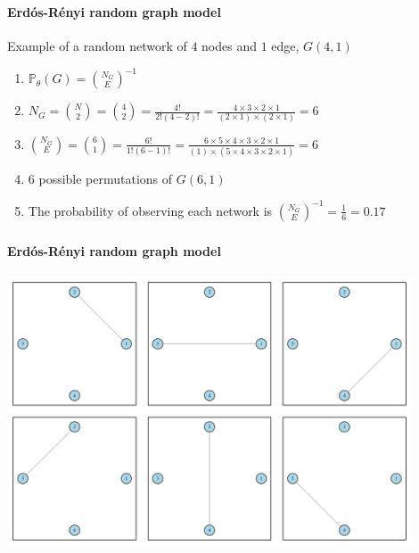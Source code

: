\documentclass[8pt]{beamer}
\begin{document}

\begin{frame}
\frametitle{\insertsection}
\framesubtitle{Erd\'os-R\'enyi random graph model}

Example of a random network of $4$ nodes and $1$ edge, $G(4,1)$

\begin{enumerate}
\item $\mathbb{P}_{\theta}(G)={\binom{N_{G}}{E}}^{-1}$
\item $N_{G}= \binom{N}{2} = \binom{4}{2} = \frac{4!}{2!(4-2)!}=\frac{4\times3\times2\times1}{(2\times1)\times(2\times1)}=6$
\item $\binom{N_{G}}{E} = \binom{6}{1} = \frac{6!}{1!(6-1)!}=\frac{6\times5\times4\times3\times2\times1}{(1)\times(5\times4\times3\times2\times1)}=6$
\item $6$ possible permutations of $G(6,1)$
\item The probability of observing each network is ${\binom{N_{G}}{E}}^{-1}=\frac{1}{6} = 0.17$
\end{enumerate}

\end{frame}


\begin{frame}
\frametitle{\insertsection}
\framesubtitle{Erd\'os-R\'enyi random graph model}

\centering
\includegraphics[width=0.9\textwidth]{erdos_4_1}

\end{frame}

\end{document}

